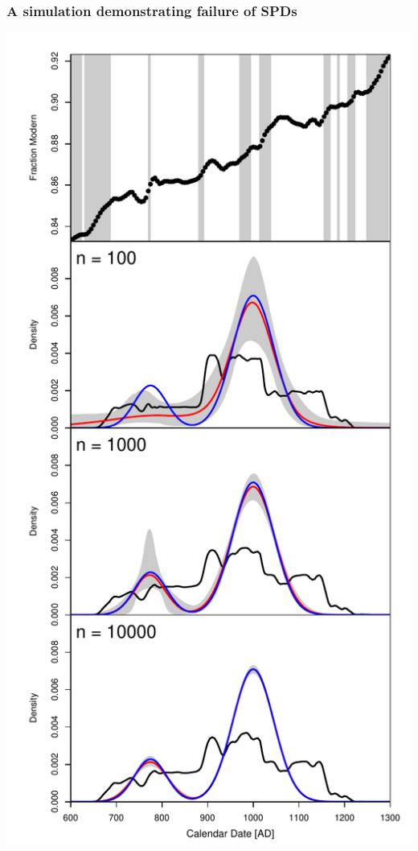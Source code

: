 \documentclass{beamer}
\begin{document}
\begin{frame}[t]
  \frametitle{A simulation demonstrating failure of SPDs}
    \includegraphics[height=.85\textheight]{Fig1_sim_inference.pdf}
\end{frame}
\end{document}
